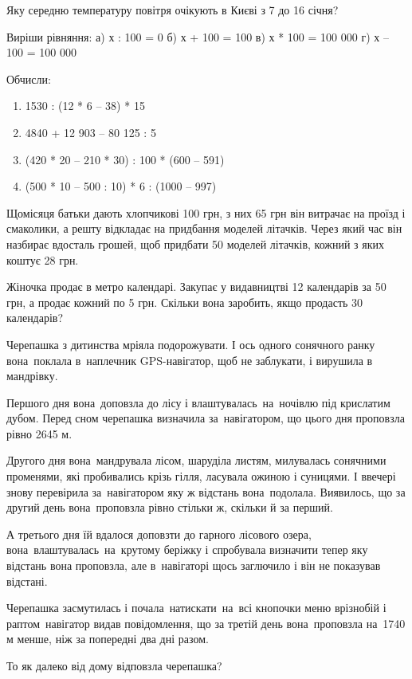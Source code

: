 Яку середню температуру повітря очікують в Києві з 7 до 16 січня?


\problem
Виріши рівняння:
а) х : 100 = 0
б) х + 100 = 100
в) х * 100 = 100 000
г) х – 100 = 100 000


\problem
Обчисли:
\begin{enumerate}
    \item 1530 : (12 * 6 – 38) * 15
    \item 4840 + 12 903 – 80 125 : 5
    \item (420 * 20 – 210 * 30) : 100 * (600 – 591)
    \item (500 * 10 – 500 : 10) * 6 : (1000 – 997)
\end{enumerate}


\problem
Щомісяця батьки дають хлопчикові 100 грн, з них 65 грн він витрачає
на проїзд і смаколики, а решту відкладає на придбання моделей літачків.
Через який час він назбирає вдосталь грошей, щоб придбати 50 моделей літачків,
кожний з яких коштує 28 грн.


\problem
Жіночка продає в метро календарі.
Закупає у видавництві 12 календарів за 50 грн, а продає кожний по 5 грн.
Скільки вона заробить, якщо продасть 30 календарів?


\problem
Черепашка з дитинства мріяла подорожувати. І ось одного сонячного ранку
вона поклала в наплечник GPS-навігатор, щоб не заблукати,
і вирушила в мандрівку.

Першого дня вона доповзла до лісу і влаштувалась на ночівлю під крислатим
дубом. Перед сном черепашка визначила за навігатором, що цього дня
проповзла рівно 2645 м.

Другого дня вона мандрувала лісом, шаруділа листям, милувалась сонячними
променями, які пробивались крізь гілля, ласувала ожиною і суницями.
І ввечері знову перевірила за навігатором яку ж відстань вона подолала.
Виявилось, що за другий день вона проповзла рівно стільки ж,
скільки й за перший.

А третього дня їй вдалося доповзти до гарного лісового озера,
вона влаштувалась на крутому беріжку і спробувала визначити тепер
яку відстань вона проповзла, але в навігаторі щось заглючило
і він не показував відстані.

Черепашка засмутилась і почала натискати на всі кнопочки меню врізнобій
і раптом навігатор видав повідомлення, що за третій день вона проповзла
на 1740 м менше, ніж за попередні два дні разом.

То як далеко від дому відповзла черепашка?


